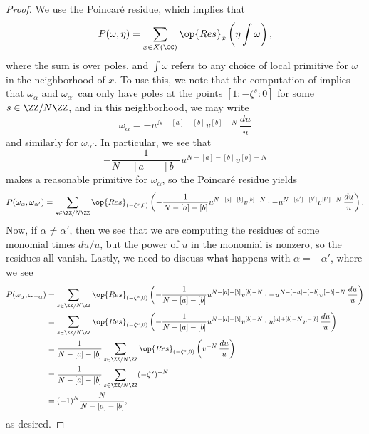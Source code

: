 \documentclass[../thesis.tex]{subfiles}
\begin{document}
\begin{proof}
	We use the Poincar\'e residue, which implies that
	\[P(\omega,\eta)=\sum_{x\in X(\CC)}\op{Res}_x\left(\eta\int\omega\right),\]
	where the sum is over poles, and $\int\omega$ refers to any choice of local primitive for $\omega$ in the neighborhood of $x$. To use this, we note that the computation of  implies that $\omega_{\alpha}$ and $\omega_{\alpha'}$ can only have poles at the points $[1:-\zeta^s:0]$ for some $s\in\ZZ/N\ZZ$, and in this neighborhood, we may write
	\[\omega_\alpha=-u^{N-[a]-[b]}v^{[b]-N}\,\frac{du}u\]
	and similarly for $\omega_{\alpha'}$. In particular, we see that
	\[-\frac1{N-[a]-[b]}u^{N-[a]-[b]}v^{[b]-N}\]
	makes a reasonable primitive for $\omega_\alpha$, so the Poincar\'e residue yields
	\[P(\omega_\alpha,\omega_{\alpha'}) = \sum_{s\in\ZZ/N\ZZ}\op{Res}_{(-\zeta^s,0)}\left(-\frac1{N-[a]-[b]}u^{N-[a]-[b]}v^{[b]-N}\cdot-u^{N-[a']-[b']}v^{[b']-N}\,\frac{du}u\right).\]
	Now, if $\alpha\ne\alpha'$, then we see that we are computing the residues of some monomial times $du/u$, but the power of $u$ in the monomial is nonzero, so the residues all vanish. Lastly, we need to discuss what happens with $\alpha=-\alpha'$, where we see
	\begin{align*}
		P(\omega_\alpha,\omega_{-\alpha}) &= \sum_{s\in\ZZ/N\ZZ}\op{Res}_{(-\zeta^s,0)}\left(-\frac1{N-[a]-[b]}u^{N-[a]-[b]}v^{[b]-N}\cdot-u^{N-[-a]-[-b]}v^{[-b]-N}\,\frac{du}u\right) \\
		&= \sum_{s\in\ZZ/N\ZZ}\op{Res}_{(-\zeta^s,0)}\left(-\frac1{N-[a]-[b]}u^{N-[a]-[b]}v^{[b]-N}\cdot u^{[a]+[b]-N}v^{-[b]}\,\frac{du}u\right) \\
		&= \frac1{N-[a]-[b]}\sum_{s\in\ZZ/N\ZZ}\op{Res}_{(-\zeta^s,0)}\left(v^{-N}\,\frac{du}u\right) \\
		&= \frac1{N-[a]-[b]}\sum_{s\in\ZZ/N\ZZ}(-\zeta^s)^{-N} \\
		&= (-1)^N\frac N{N-[a]-[b]},
	\end{align*}
	as desired.
\end{proof}
\end{document}
